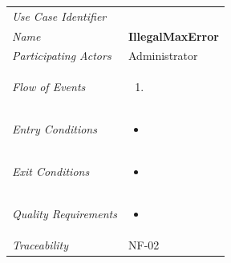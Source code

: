 \documentclass[12pt,letterpaper]{article}
\begin{document}
\begin{center}
	\begin{tabu} to 
		\toprule
		Use Case Identifier & \illegalmaxerror{} \\
		Name & {\bf IllegalMaxError} \\
		Participating Actors & Administrator \\
		Flow of Events & 
	    \begin{enumerate}[topsep=-1em,leftmargin=*]
		    \item 
		\end{enumerate} \\

		Entry Conditions &
		\begin{itemize}[topsep=-1em,leftmargin=*]
		    \item 
        \end{itemize} \\

		Exit Conditions &
		\begin{itemize}[topsep=-1em,leftmargin=*]
		    \item 
        \end{itemize} \\

		Quality Requirements &
		\begin{itemize}[topsep=-1em,leftmargin=*]
		    \item 
        \end{itemize} \\

		Traceability & NF-02 \\
		\toprule
	\end{tabu}
\end{center}
\end{document}
